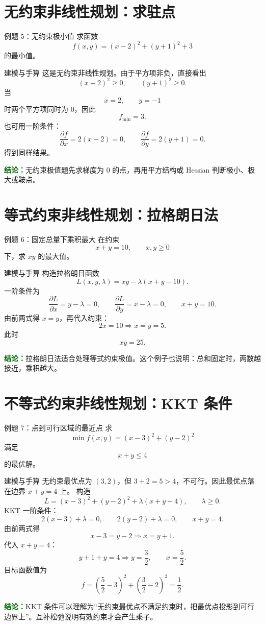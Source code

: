 \documentclass[UTF8,12pt,a4paper]{ctexart}
\newcommand{\conclusion}[1]{\par\smallskip\noindent\textcolor{darkgreen}{\textbf{结论：}}#1\par\smallskip}
\begin{document}
\section{无约束非线性规划：求驻点}
\begin{examplebox}{例题 5：无约束极小值}
求函数
\[
f(x,y)=(x-2)^2+(y+1)^2+3
\]
的最小值。
\end{examplebox}

\begin{solbox}{建模与手算}
这是无约束非线性规划。由于平方项非负，直接看出
\[
(x-2)^2\ge 0,
\qquad (y+1)^2\ge 0.
\]
当
\[
x=2,
\qquad y=-1
\]
时两个平方项同时为 0，因此
\[
f_{\min}=3.
\]
也可用一阶条件：
\[
\frac{\partial f}{\partial x}=2(x-2)=0,
\qquad
\frac{\partial f}{\partial y}=2(y+1)=0.
\]
得到同样结果。
\end{solbox}
\conclusion{无约束极值题先求梯度为 0 的点，再用平方结构或 Hessian 判断极小、极大或鞍点。}

\section{等式约束非线性规划：拉格朗日法}
\begin{examplebox}{例题 6：固定总量下乘积最大}
在约束
\[
x+y=10,
\qquad x,y\ge 0
\]
下，求 $xy$ 的最大值。
\end{examplebox}

\begin{solbox}{建模与手算}
构造拉格朗日函数
\[
L(x,y,\lambda)=xy-\lambda(x+y-10).
\]
一阶条件为
\[
\frac{\partial L}{\partial x}=y-\lambda=0,
\qquad
\frac{\partial L}{\partial y}=x-\lambda=0,
\qquad x+y=10.
\]
由前两式得 $x=y$，再代入约束：
\[
2x=10\Rightarrow x=y=5.
\]
此时
\[
xy=25.
\]
\end{solbox}
\conclusion{拉格朗日法适合处理等式约束极值。这个例子也说明：总和固定时，两数越接近，乘积越大。}

\section{不等式约束非线性规划：KKT 条件}
\begin{examplebox}{例题 7：点到可行区域的最近点}
求
\[
\min f(x,y)=(x-3)^2+(y-2)^2
\]
满足
\[
x+y\le 4
\]
的最优解。
\end{examplebox}

\begin{solbox}{建模与手算}
无约束最优点为 $(3,2)$，但 $3+2=5>4$，不可行。因此最优点落在边界 $x+y=4$ 上。
构造
\[
L=(x-3)^2+(y-2)^2+\lambda(x+y-4),\qquad \lambda\ge0.
\]
KKT 一阶条件：
\[
2(x-3)+\lambda=0,
\qquad 2(y-2)+\lambda=0,
\qquad x+y=4.
\]
由前两式得
\[
x-3=y-2\Rightarrow x=y+1.
\]
代入 $x+y=4$：
\[
y+1+y=4\Rightarrow y=\frac32,
\qquad x=\frac52.
\]
目标函数值为
\[
f=\left(\frac52-3\right)^2+\left(\frac32-2\right)^2=\frac12.
\]
\end{solbox}
\conclusion{KKT 条件可以理解为“无约束最优点不满足约束时，把最优点投影到可行边界上”。互补松弛说明有效约束才会产生乘子。}
\end{document}
